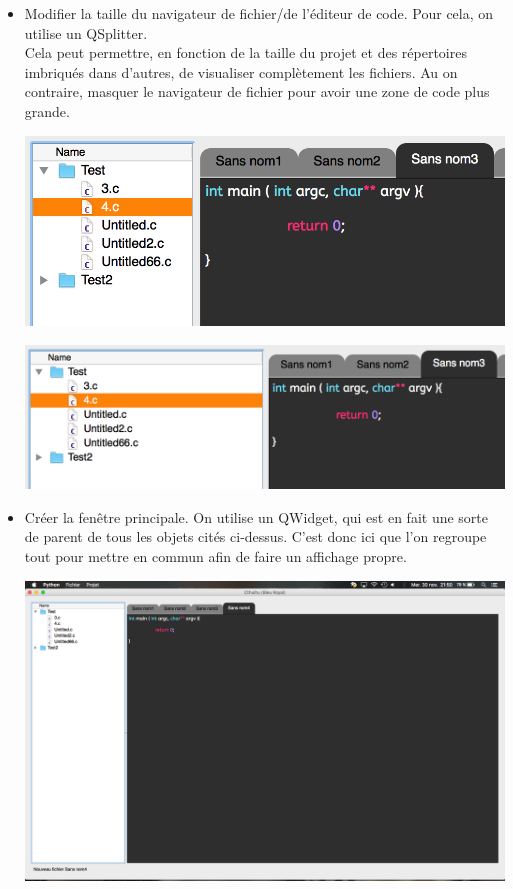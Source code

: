 \documentclass[a4paper,12pt]{article}
\begin{document}
\begin{itemize}
			\item Modifier la taille du navigateur de fichier/de l'éditeur de code. Pour cela, on utilise un QSplitter.\\ 
			Cela peut permettre, en fonction de la taille du projet et des répertoires imbriqués dans d'autres, de visualiser complètement les fichiers. Au on contraire, masquer le navigateur de fichier pour avoir une zone de code plus grande.\\
			
			\begin{center}
				\includegraphics[scale=0.6]{images/QSplitter_1}
				\vspace{0.6cm}
			\end{center}

			\begin{center}
				\includegraphics[scale=0.6]{images/QSplitter_2}
				\vspace{0.6cm}
			\end{center}
			
			\item Créer la fenêtre principale. On utilise un QWidget, qui est en fait une sorte de parent de tous les objets cités ci-dessus. C'est donc ici que l'on regroupe tout pour mettre en commun afin de faire un affichage propre.
			\begin{center}
				\includegraphics[scale=0.3]{images/QWidget}
				\vspace{0.6cm}
			\end{center}
			

\end{itemize}
\end{document}
